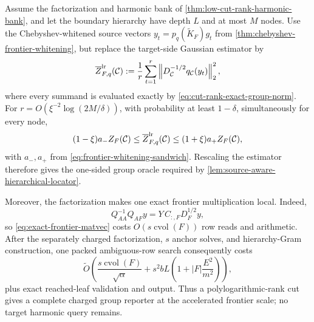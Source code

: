 \begin{corollary}
\label{cor:low-cut-rank-packed-reporter}
Assume the factorization and harmonic bank of
\cref{thm:low-cut-rank-harmonic-bank}, and let the boundary hierarchy have
depth $L$ and at most $M$ nodes.  Use the Chebyshev-whitened source vectors
$y_t=p_q(\widetilde K_F)g_t$ from
\cref{thm:chebyshev-frontier-whitening}, but replace the target-side Gaussian
estimator by
\begin{equation}
 \overline Z_{F,q}^{\rm lr}(\mathcal C)
 :=\frac1r\sum_{t=1}^r
 \left\|D_{\mathcal C}^{-1/2}q_{\mathcal C}(y_t)\right\|_2^2,
 \label{eq:low-rank-source-only-estimator}
\end{equation}
where every summand is evaluated exactly by
\cref{eq:cut-rank-exact-group-norm}.  For
$r=O(\xi^{-2}\log(2M/\delta))$, with probability at least $1-\delta$,
simultaneously for every node,
\begin{equation}
 (1-\xi)a_-Z_F(\mathcal C)
 \leq\overline Z_{F,q}^{\rm lr}(\mathcal C)
 \leq(1+\xi)a_+Z_F(\mathcal C),
 \label{eq:low-rank-source-only-guarantee}
\end{equation}
with $a_-,a_+$ from
\cref{eq:frontier-whitening-sandwich}.  Rescaling the estimator therefore
gives the one-sided group oracle required by
\cref{lem:source-aware-hierarchical-locator}.

Moreover, the factorization makes one exact frontier multiplication local.
Indeed,
\begin{equation}
 Q_{AA}^{-1}Q_{AF}y
 =Y\,C_{:,F}D_F^{1/2}y,
 \label{eq:low-rank-anchor-application}
\end{equation}
so \cref{eq:exact-frontier-matvec} costs
$O(s\operatorname{cvol}(F))$ row reads and arithmetic.  After the separately
charged factorization, $s$ anchor solves, and hierarchy-Gram construction,
one packed ambiguous-row search consequently costs
\begin{equation}
 \widetilde O\!\left(
  \frac{s\operatorname{cvol}(F)}{\sqrt\alpha}
  +s^2bL\left(1+|F|\frac{E^2}{m^2}\right)
 \right),
 \label{eq:low-rank-packed-reporter-work}
\end{equation}
plus exact reached-leaf validation and output.  Thus a polylogarithmic-rank
cut gives a complete charged group reporter at the accelerated frontier
scale; no target harmonic query remains.
\end{corollary}

